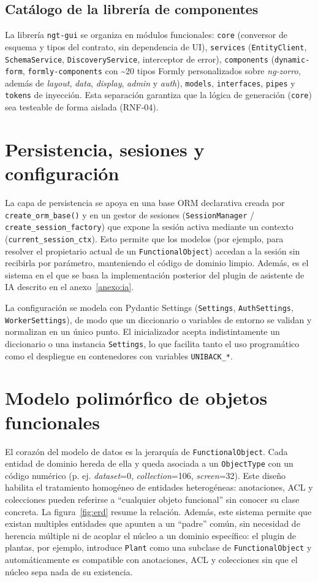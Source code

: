 \subsection{Catálogo de la librería de componentes}
La librería \texttt{ngt-gui} se organiza en módulos funcionales: \texttt{core}
(conversor de esquema y tipos del contrato, sin dependencia de UI),
\texttt{services} (\texttt{EntityClient}, \texttt{SchemaService},
\texttt{DiscoveryService}, interceptor de error), \texttt{components}
(\texttt{dynamic-form}, \texttt{formly-components} con \textasciitilde20 tipos
Formly personalizados sobre \emph{ng-zorro}, además de \emph{layout},
\emph{data}, \emph{display}, \emph{admin} y \emph{auth}), \texttt{models},
\texttt{interfaces}, \texttt{pipes} y \texttt{tokens} de inyección. Esta
separación garantiza que la lógica de generación (\texttt{core}) sea
testeable de forma aislada (RNF-04).

\section{Persistencia, sesiones y configuración}
La capa de persistencia se apoya en una base ORM declarativa creada por
\texttt{create\_orm\_base()} y en un gestor de sesiones
(\texttt{SessionManager} / \texttt{create\_session\_factory}) que expone la
sesión activa mediante un contexto (\texttt{current\_session\_ctx}). Esto
permite que los modelos (por ejemplo, para resolver el propietario actual
de un \texttt{FunctionalObject}) accedan a la sesión sin recibirla por
parámetro, manteniendo el código de dominio limpio. Además, es el sistema en
el que se basa la implementación posterior del plugin de asistente de IA descrito
en el anexo~\ref{anexo:ia}.

La configuración se modela con Pydantic Settings (\texttt{Settings},
\texttt{AuthSettings}, \texttt{WorkerSettings}), de modo que un diccionario o
variables de entorno se validan y normalizan en un único punto. El
inicializador acepta indistintamente un diccionario o una instancia
\texttt{Settings}, lo que facilita tanto el uso programático como el despliegue
en contenedores con variables \texttt{UNIBACK\_*}.

\section{Modelo polimórfico de objetos funcionales}
El corazón del modelo de datos es la jerarquía de \texttt{FunctionalObject}.
Cada entidad de dominio hereda de ella y queda asociada a un
\texttt{ObjectType} con un código numérico (p. ej. \emph{dataset}=0,
\emph{collection}=106, \emph{screen}=32). Este diseño habilita el tratamiento
homogéneo de entidades heterogéneas: anotaciones, ACL y colecciones pueden
referirse a ``cualquier objeto funcional'' sin conocer su clase concreta. La
figura~\ref{fig:erd} resume la relación. Además, este sistema
permite que existan multiples entidades que apunten a un ``padre'' común, sin necesidad de 
herencia múltiple ni de acoplar el núcleo a un dominio específico: el plugin de plantas, 
por ejemplo, introduce \texttt{Plant} como una subclase de \texttt{FunctionalObject} y 
automáticamente es compatible con anotaciones, ACL y colecciones sin que el núcleo 
sepa nada de su existencia.

